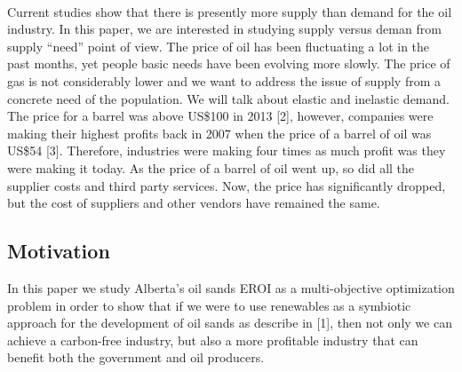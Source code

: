 \documentclass[12pt]{article}
\newcommand{\h}[1]{\colorbox{yellow}{#1}}
\begin{document}

\\

Current studies show that there is presently more supply than demand for the oil industry. In this paper, we are interested in studying supply versus deman from supply ``need'' point of view. The price of oil has been fluctuating a lot in the past months, yet people basic needs have been evolving more slowly. The price of gas is not considerably lower and we want to address the issue of  supply from a concrete need of the population. We will talk about elastic and inelastic demand. \\


The price for a barrel was above US\$100 in 2013 [2], however, companies were making their highest profits back in 2007 when the price of a barrel of oil was US\$54 [3]. Therefore, industries were making four times as much profit was they were making it today. As the price of a barrel of oil went up, so did all the supplier costs and third party services. Now, the price has significantly dropped, but the cost of suppliers and other vendors have remained the same. \\


\subsection{Motivation}
In this paper we study Alberta's oil sands EROI as a multi-objective optimization problem in order to show that if we were to use renewables as a symbiotic approach for the development of oil sands as describe in [1], then not only we can achieve a carbon-free industry, but also a more profitable industry that can benefit both the government and oil producers. \\
\end{document}
